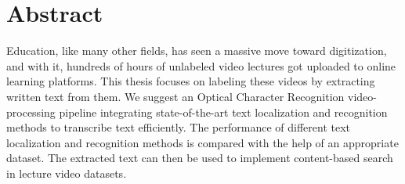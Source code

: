 \chapter*{Abstract}
Education, like many other fields, has seen a massive move toward digitization, and with it, hundreds of hours of unlabeled video lectures got uploaded to online learning platforms. This thesis focuses on labeling these videos by extracting written text from them. We suggest an Optical Character Recognition video-processing pipeline integrating state-of-the-art text localization and recognition methods to transcribe text efficiently. The performance of different text localization and recognition methods is compared with the help of an appropriate dataset. The extracted text can then be used to implement content-based search in lecture video datasets.